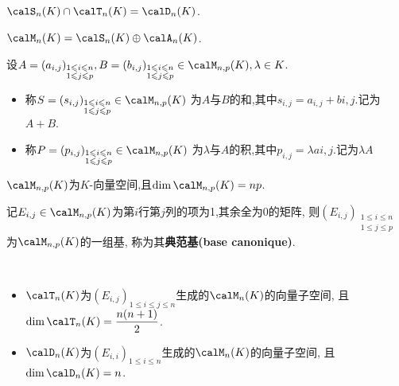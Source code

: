 \begin{prop}
    $\calS_n(K) \cap \calT_n(K) = \calD_n(K)$.
\end{prop}

\begin{prop}
    $\calM_n(K) = \calS_n(K) \oplus \calA_n(K)$.
\end{prop}

\begin{deff}
    设$A = (a_{i, j})_{\substack{1 \leqslant i \leqslant n \\ 1 \leqslant j \leqslant p}},
    B = (b_{i, j})_{\substack{1 \leqslant i \leqslant n \\ 1 \leqslant j \leqslant p}} \in \calM_{n, p}(K), \lambda \in K$.
    \begin{itemize}
        \item 称$S = (s_{i, j})_{\substack{1 \leqslant i \leqslant n \\ 1 \leqslant j \leqslant p}} \in \calM_{n, p}(K)$
            为$A$与$B$的和,其中$s_{i, j} = a_{i, j} + b{i, j}$.记为$A + B$.
        \item 称$P = (p_{i, j})_{\substack{1 \leqslant i \leqslant n \\ 1 \leqslant j \leqslant p}} \in \calM_{n, p}(K)$
            为$\lambda$与$A$的积,其中$p_{i, j} = \lambda a{i, j}$.记为$\lambda A$
    \end{itemize}
\end{deff}

\begin{thm}
    $\calM_{n, p}(K)$为$K$-向量空间,且$\dim \calM_{n, p}(K) = np$.
\end{thm}

\begin{rqq}
    记$E_{i, j} \in \calM_{n, p}(K)$为第$i$行第$j$列的项为1,其余全为0的矩阵,
    则$(E_{i, j})_{\substack{1 \leqslant i \leqslant n \\ 1 \leqslant j \leqslant p}}$为$\calM_{n, p}(K)$的一组基,
    称为其\textbf{典范基(base canonique)}.
\end{rqq}

\begin{rqq} $\ $
    \begin{itemize}
        \item $\calT_n(K)$为$(E_{i, j})_{1 \leqslant i \leqslant j \leqslant n}$生成的$\calM_n(K)$的向量子空间,
            且$\dim \calT_n(K) = \dfrac{n(n + 1)}{2}$.
        \item $\calD_n(K)$为$(E_{i, i})_{1 \leqslant i \leqslant n}$生成的$\calM_n(K)$的向量子空间,
            且$\dim \calD_n(K) = n$.
    \end{itemize}
\end{rqq}

